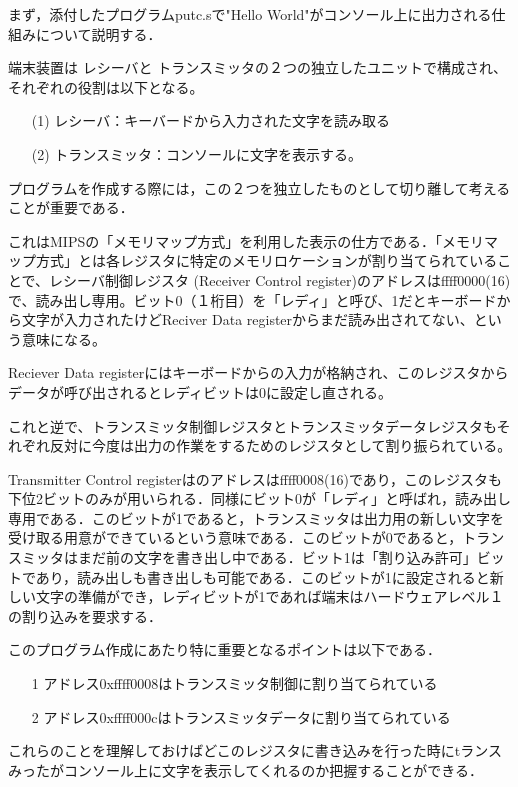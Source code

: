\documentclass[a4j]{jarticle}
\begin{document}
まず，添付したプログラムputc.sで"Hello World"がコンソール上に出力される仕組みについて説明する．

端末装置は レシーバと トランスミッタの２つの独立したユニットで構成され、それぞれの役割は以下となる。

\begin{itemize}
\item[(1)]レシーバ：キーバードから入力された文字を読み取る
\item[(2)]トランスミッタ：コンソールに文字を表示する。
\end{itemize}

プログラムを作成する際には，この２つを独立したものとして切り離して考えることが重要である．

これはMIPSの「メモリマップ方式」を利用した表示の仕方である．「メモリマップ方式」とは各レジスタに特定のメモリロケーションが割り当てられていることで、レシーバ制御レジスタ (Receiver Control register)のアドレスはffff0000(16)で、読み出し専用。ビット0（１桁目）を「レディ」と呼び、1だとキーボードから文字が入力されたけどReciver Data registerからまだ読み出されてない、という意味になる。

Reciever Data registerにはキーボードからの入力が格納され、このレジスタからデータが呼び出されるとレディビットは0に設定し直される。

これと逆で、トランスミッタ制御レジスタとトランスミッタデータレジスタもそれぞれ反対に今度は出力の作業をするためのレジスタとして割り振られている。

Transmitter Control registerはのアドレスはffff0008(16)であり，このレジスタも下位2ビットのみが用いられる．同様にビット0が「レディ」と呼ばれ，読み出し専用である．このビットが1であると，トランスミッタは出力用の新しい文字を受け取る用意ができているという意味である．このビットが0であると，トランスミッタはまだ前の文字を書き出し中である．ビット1は「割り込み許可」ビットであり，読み出しも書き出しも可能である．このビットが1に設定されると新しい文字の準備ができ，レディビットが1であれば端末はハードウェアレベル１の割り込みを要求する．

このプログラム作成にあたり特に重要となるポイントは以下である．

\begin{itemize}
\item[1]アドレス0xffff0008はトランスミッタ制御に割り当てられている
\item[2]アドレス0xffff000cはトランスミッタデータに割り当てられている
\end{itemize}

これらのことを理解しておけばどこのレジスタに書き込みを行った時にtランスみったがコンソール上に文字を表示してくれるのか把握することができる．
\end{document}
